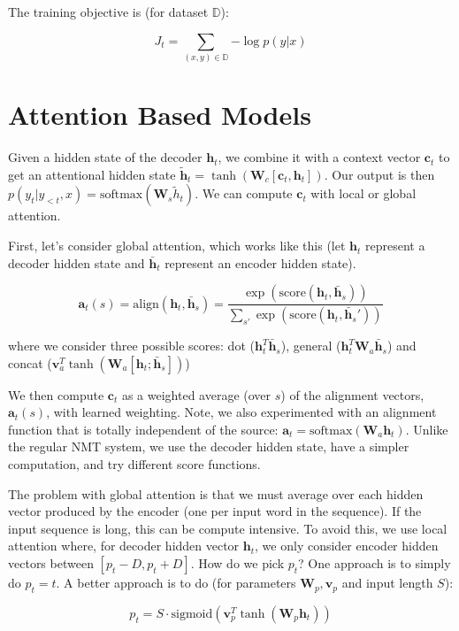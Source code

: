 \documentclass[a4paper]{article}
\begin{document}
The training objective is (for dataset $\mathbb{D}$):

$$
J_t = \sum_{(x, y) \in \mathbb{D}}{- \log p(y|x)}
$$

\section{Attention Based Models}
Given a hidden state of the decoder $\mathbf{h}_t$, we combine it with a context
vector $\mathbf{c}_t$ to get an attentional hidden state
$\mathbf{\tilde{h}}_t = \tanh{(\mathbf{W}_c [\mathbf{c}_t, \mathbf{h}_t])}$.
Our output
is then $p(y_t | y_{<t}, x) = \text{softmax}(\mathbf{W}_s \tilde{h}_t)$.
We can compute $\mathbf{c}_t$ with local or global attention.

First, let's consider global attention, which works like this (let
$\mathbf{h}_t$ represent a decoder hidden state and $\mathbf{\bar{h}}_t$
represent an encoder hidden state).

$$
\mathbf{a}_t(s) = \text{align}(\mathbf{h}_t, \mathbf{\bar{h}}_s)
= \frac{\exp(\text{score}(
\mathbf{h}_t, \mathbf{\bar{h}}_s
))}{\sum_{s'}{\exp(\text{score}(
\mathbf{h}_t, \mathbf{\bar{h}}_s'
))}}
$$

where we consider three possible scores: dot
($\mathbf{h}_t^T \mathbf{\bar{h}}_s$), general
($\mathbf{h}_t^T \mathbf{W}_a \mathbf{\bar{h}}_s$) and concat
($\mathbf{v}_a^T \tanh{(\mathbf{W}_a  [\mathbf{h}_t; \mathbf{\bar{h}}_s])}$)

We then compute $\mathbf{c}_t$ as a weighted average (over $s$) of the alignment
vectors, $\mathbf{a}_t(s)$, with learned weighting. Note, we also experimented
with an alignment function that is totally independent of the source:
$\mathbf{a}_t = \text{softmax}(\mathbf{W}_a \mathbf{h}_t)$. Unlike the regular
NMT system, we use the decoder hidden state, have a simpler computation, and try
different score functions.

The problem with global attention is that we must average over each hidden
vector produced by the encoder (one per input word in the sequence). If the
input sequence is long, this can be compute intensive.
To avoid this, we use local attention
where, for decoder hidden vector $\mathbf{h}_t$, we only consider encoder hidden
vectors between $[p_t - D, p_t + D]$. How do we pick $p_t$? One approach
is to simply do $p_t = t$. A better approach is to do (for parameters
$\mathbf{W}_p, \mathbf{v}_p$ and input length $S$):

$$
p_t = S \cdot \text{sigmoid}(\mathbf{v}_p^T \tanh(\mathbf{W}_p \mathbf{h}_t))
$$
\end{document}
